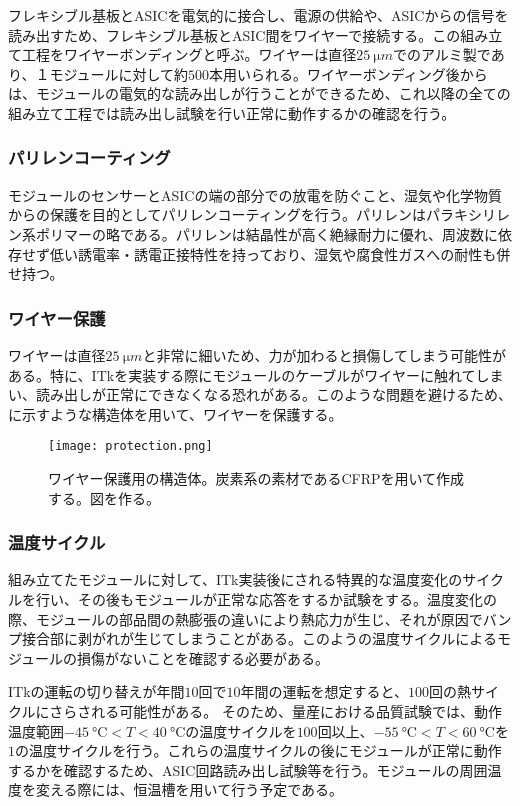 フレキシブル基板とASICを電気的に接合し、電源の供給や、ASICからの信号を読み出すため、フレキシブル基板とASIC間をワイヤーで接続する。この組み立て工程をワイヤーボンディングと呼ぶ。ワイヤーは直径$25\ \si{\micro m}$でのアルミ製であり、１モジュールに対して約$500$本用いられる。ワイヤーボンディング後からは、モジュールの電気的な読み出しが行うことができるため、これ以降の全ての組み立て工程では読み出し試験を行い正常に動作するかの確認を行う。

\subsubsection*{パリレンコーティング}

モジュールのセンサーとASICの端の部分での放電を防ぐこと、湿気や化学物質からの保護を目的としてパリレンコーティングを行う。パリレンはパラキシリレン系ポリマーの略である。パリレンは結晶性が高く絶縁耐力に優れ、周波数に依存せず低い誘電率・誘電正接特性を持っており、湿気や腐食性ガスへの耐性も併せ持つ。


\subsubsection*{ワイヤー保護}

ワイヤーは直径$25\ \si{\micro m}$と非常に細いため、力が加わると損傷してしまう可能性がある。特に、ITkを実装する際にモジュールのケーブルがワイヤーに触れてしまい、読み出しが正常にできなくなる恐れがある。このような問題を避けるため、に示すような構造体を用いて、ワイヤーを保護する。

\begin{figure}[tbp]
  \centering
  \texttt{[image: protection.png]}
  \caption[ワイヤー保護用の構造体]{ワイヤー保護用の構造体。炭素系の素材であるCFRPを用いて作成する。図を作る。 }
  \label{fig:protection}
\end{figure}

\subsubsection*{温度サイクル}


組み立てたモジュールに対して、ITk実装後にされる特異的な温度変化のサイクルを行い、その後もモジュールが正常な応答をするか試験をする。温度変化の際、モジュールの部品間の熱膨張の違いにより熱応力が生じ、それが原因でバンプ接合部に剥がれが生じてしまうことがある。このようの温度サイクルによるモジュールの損傷がないことを確認する必要がある。

ITkの運転の切り替えが年間$10$回で$10$年間の運転を想定すると、$100$回の熱サイクルにさらされる可能性がある。
そのため、量産における品質試験では、動作温度範囲$-45\ \si{\degreeCelsius}<T<40\ \si{\degreeCelsius}$の温度サイクルを$100$回以上、$-55\ \si{\degreeCelsius}<T<60\ \si{\degreeCelsius}$を$1$の温度サイクルを行う。これらの温度サイクルの後にモジュールが正常に動作するかを確認するため、ASIC回路読み出し試験等を行う。モジュールの周囲温度を変える際には、恒温槽を用いて行う予定である。

